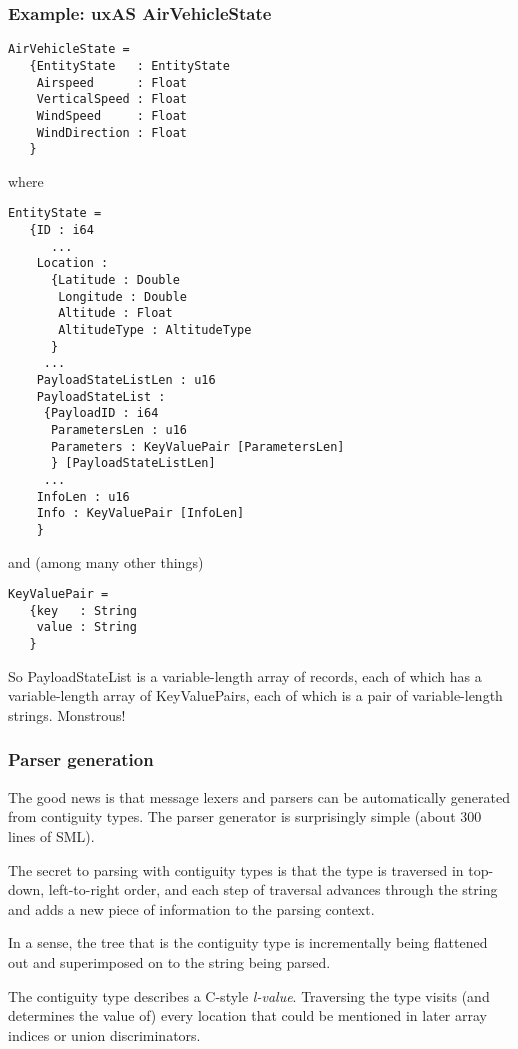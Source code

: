 \documentclass{beamer}
\begin{document}
\begin{frame}\frametitle{Example: uxAS AirVehicleState}

\begin{verbatim}
AirVehicleState =
   {EntityState   : EntityState
    Airspeed      : Float
    VerticalSpeed : Float
    WindSpeed     : Float
    WindDirection : Float
   }
\end{verbatim}

\noindent where

\begin{verbatim}
EntityState =
   {ID : i64
      ...
    Location :
      {Latitude : Double
       Longitude : Double
       Altitude : Float
       AltitudeType : AltitudeType
      }
     ...
    PayloadStateListLen : u16
    PayloadStateList :
     {PayloadID : i64
      ParametersLen : u16
      Parameters : KeyValuePair [ParametersLen]
      } [PayloadStateListLen]
     ...
    InfoLen : u16
    Info : KeyValuePair [InfoLen]
    }
\end{verbatim}

\noindent and (among many other things)
\begin{verbatim}
KeyValuePair =
   {key   : String
    value : String
   }
\end{verbatim}

So PayloadStateList is a variable-length array of records, each of
which has a variable-length array of KeyValuePairs, each of which is a
pair of variable-length strings. Monstrous!
\end{frame}

\begin{frame}\frametitle{Parser generation}

The good news is that message lexers and parsers can be automatically
generated from contiguity types. The parser generator is surprisingly
simple (about 300 lines of SML).

\vspace*{5mm}

The secret to parsing with contiguity types is that the type is
traversed in top-down, left-to-right order, and each step of traversal
advances through the string and adds a new piece of information to the
parsing context.

\vspace*{5mm}

In a sense, the tree that is the contiguity type is incrementally
being flattened out and superimposed on to the string being parsed.

\vspace*{3mm}

The contiguity type describes a C-style \emph{l-value}. Traversing the
type visits (and determines the value of) every location that could be
mentioned in later array indices or union discriminators.

\end{frame}
\end{document}

